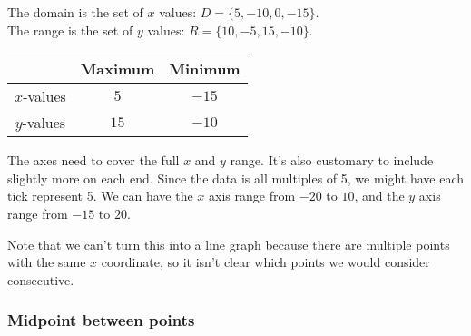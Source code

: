 \documentclass{article}
\begin{document}
\begin{solution}
    \begin{problem}
        \item The domain is the set of $x$ values: $D=\{5,-10,0,-15\}$.\\ The range is the set of $y$ values: $R=\{10,-5,15,-10\}$.
        \item \;\vspace{-15pt}\begin{center} 
        \begin{tabular}{c|cc}
            & Maximum & Minimum \\ \hline
            $x$-values & $5$ & $-15$ \\
            $y$-values & $15$ & $-10$
        \end{tabular}\end{center}
        \item The axes need to cover the full $x$ and $y$ range. It's also customary to include slightly more on each end. Since the data is all multiples of 5, we might have each tick represent 5. We can have the $x$ axis range from $-20$ to $10$, and the $y$ axis range from $-15$ to $20$.
        \item \;\vspace{-15pt} \begin{center}\end{center}
    \end{problem}
    Note that we can't turn this into a line graph because there are multiple points with the same $x$ coordinate, so it isn't clear which points we would consider consecutive.
\end{solution}

\subsubsection{Midpoint between points}
\end{document}
